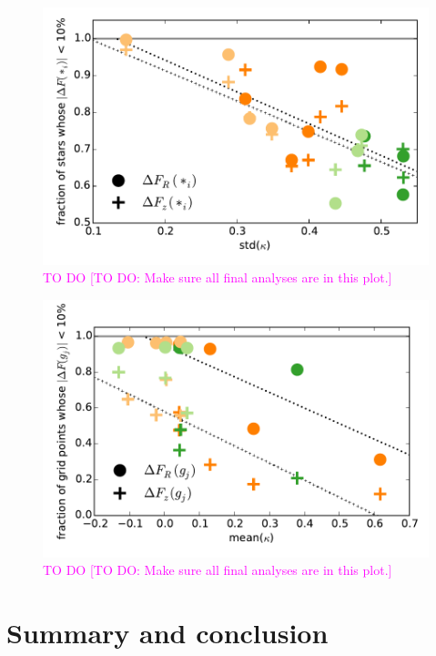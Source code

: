 \documentclass[iop,revtex4,numberedappendix,appendixfloats]{emulateapj}
\newcommand{\Wilma}[1]{\textcolor{Magenta}{#1}}
\begin{document}
\begin{figure}[!htbp]
\centering
\includegraphics[width=\columnwidth]{fig/MNdHHdiffSph2_plot_stdkappa_vs_frac10star.pdf}
\caption{\Wilma{TO DO} \Wilma{[TO DO: Make sure all final analyses are in this plot.]}}
\label{fig:????}
\end{figure}

\begin{figure}[!htbp]
\centering
\includegraphics[width=\columnwidth]{fig/MNdHHdiffSph2_plot_meankappa_vs_frac10grid.pdf}
\caption{\Wilma{TO DO} \Wilma{[TO DO: Make sure all final analyses are in this plot.]}}
\label{fig:????}
\end{figure}

\section{Summary and conclusion}

{}

\end{document}
